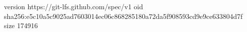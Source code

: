 version https://git-lfs.github.com/spec/v1
oid sha256:e5c10a5c9025ad7603014ec06c868285180a72da5f908593cd9e9ce633804d7f
size 174916
